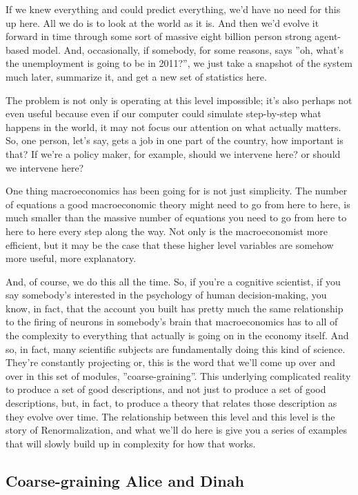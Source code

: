 \documentclass[]{article}
\begin{document}
If we knew everything and could predict everything, we'd have no need for this up here. All we do is to look at the world as it is.
And then we'd evolve it forward in time through some sort of massive eight billion person strong agent-based model. And, occasionally, if somebody, for some reasons, says ''oh, what's the unemployment is going to be in 2011?'', we just take a snapshot of the system much later, summarize it, and get a new set of statistics here.

The problem is not only is operating at this level impossible; it's also perhaps not even useful because even if our computer could simulate step-by-step what happens in the world, it may not focus our attention on what actually matters.
So, one person, let's say, gets a job in one part of the country, how important is that?
If we're a policy maker, for example, should we intervene here?
or should we intervene here?

One thing macroeconomics has been going for is not just simplicity.
The number of equations a good  macroeconomic theory might need to go from here to here, is much smaller than the massive number of equations you need to go from here to here to here every step along the way.
Not only is the macroeconomist more efficient, but it may be the case that these higher level variables are somehow more useful, more explanatory.

And, of course, we do this all the time.
So, if you're a cognitive scientist, if you say somebody's interested in the psychology of human decision-making, you know, in fact, that the account you built has pretty much the same relationship to the firing of neurons in somebody's brain
that macroeconomics has to all of the complexity to everything that actually is going on in the economy itself.
And so, in fact, many scientific subjects are fundamentally doing 
this kind of science.
They're constantly projecting or, this is the word that we'll come up over and over in this set of modules, ''coarse-graining''.
This underlying complicated reality to produce a set of good descriptions, and not just to produce a set of good descriptions, but, in fact, to produce a theory that relates those description as they evolve over time.
The relationship between this level and this level is the story of Renormalization,
and what we'll do here is give you a series of examples that will slowly build up in 
complexity for how that works.

\subsection{Coarse-graining Alice and Dinah}
\end{document}
